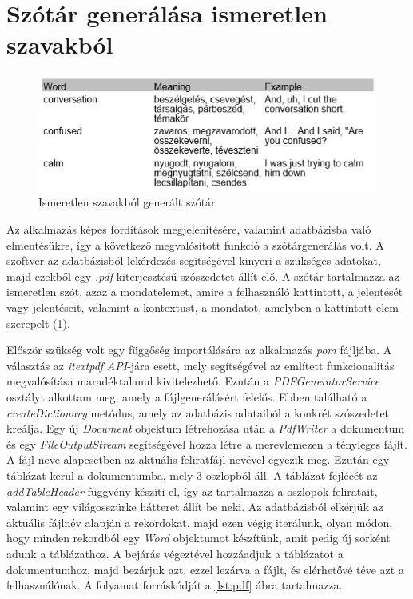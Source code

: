 \section{Szótár generálása ismeretlen szavakból}

\begin{figure}
  \includegraphics[width=\linewidth]{images/pdf.jpg}
  \caption{Ismeretlen szavakból generált szótár}
  \label{fig:pdf}
\end{figure}

Az alkalmazás képes fordítások megjelenítésére, valamint adatbázisba való elmentésükre, így a következő megvalósított funkció a szótárgenerálás volt. A szoftver az adatbázisból lekérdezés segítségével kinyeri a szükséges adatokat, majd ezekből egy \textit{.pdf} kiterjesztésű szószedetet állít elő. A szótár tartalmazza az ismeretlen szót, azaz a mondatelemet, amire a felhasználó kattintott, a jelentését vagy jelentéseit, valamint a kontextust, a mondatot, amelyben a kattintott elem szerepelt (\ref{fig:pdf}).

Először szükség volt egy függőség importálására az alkalmazás \textit{pom} fájljába. A választás az \textit{itextpdf} \textit{API}-jára esett, mely segítségével az említett funkcionalitás megvalósítása maradéktalanul kivitelezhető. Ezután a \textit{PDFGeneratorService} osztályt alkottam meg, amely a fájlgenerálásért felelős. Ebben található a \textit{createDictionary} metódus, amely az adatbázis adataiból a konkrét szószedetet kreálja. Egy új \textit{Document} objektum létrehozása után a \textit{PdfWriter} a dokumentum és egy \textit{FileOutputStream} segítségével hozza létre a merevlemezen a tényleges fájlt. A fájl neve alapesetben az aktuális feliratfájl nevével egyezik meg. Ezután egy táblázat kerül a dokumentumba, mely 3 oszlopból áll. A táblázat fejlécét az \textit{addTableHeader} függvény készíti el, így az tartalmazza a oszlopok feliratait, valamint egy világosszürke hátteret állít be neki. Az adatbázisból elkérjük az aktuális fájlnév alapján a rekordokat, majd ezen végig iterálunk, olyan módon, hogy minden rekordból egy \textit{Word} objektumot készítünk, amit pedig új sorként adunk a táblázathoz. A bejárás végeztével hozzáadjuk a táblázatot a dokumentumhoz, majd bezárjuk azt, ezzel lezárva a fájlt, és elérhetővé téve azt a felhasználónak. A folyamat forráskódját a \ref{lst:pdf} ábra tartalmazza.

